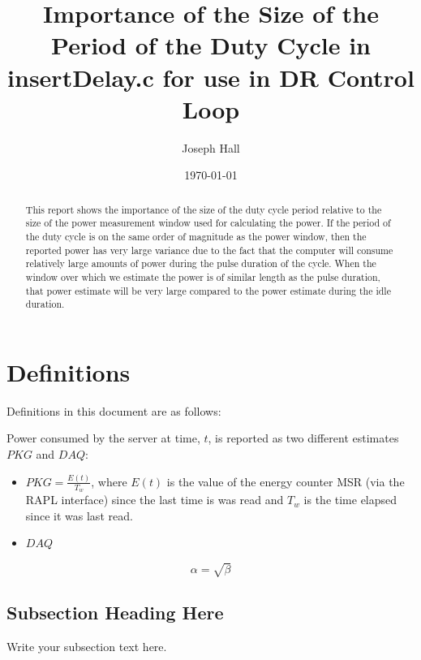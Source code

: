 \documentclass{article}
\begin{document}
\title{Importance of the Size of the Period of the Duty Cycle in insertDelay.c for use in DR Control Loop}
\author{Joseph Hall}
\date{\today}

\maketitle

\begin{abstract}
This report shows the importance of the size of the duty cycle period relative to the size of the power measurement window used for calculating the power.  If the period of the duty cycle is on the same order of magnitude as the power window, then the reported power has very large variance due to the fact that the computer will consume relatively large amounts of power during the pulse duration of the cycle.  When the window over which we estimate the power is of similar length as the pulse duration, that power estimate will be very large compared to the power estimate during the idle duration.
\end{abstract}

\section{Definitions}
Definitions in this document are as follows:

Power consumed by the server at time, $t$, is reported as two different estimates $PKG$ and $DAQ$:
\begin{itemize}
	\item $PKG=\frac{E(t)}{T_w}$, where $E(t)$ is the value of the energy counter MSR (via the RAPL interface) since the last time is was read and $T_w$ is the time elapsed since it was last read.
	\item $DAQ$ 
\end{itemize}
\begin{equation}
    \label{simple_equation}
    \alpha = \sqrt{ \beta }
\end{equation}

\subsection{Subsection Heading Here}
Write your subsection text here.
\end{document}
